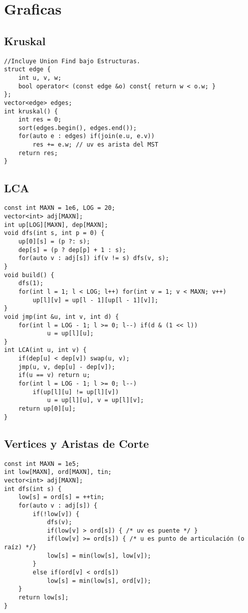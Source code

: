 \documentclass[twocolumn]{article}
\begin{document}
\section{Graficas}
\subsection{Kruskal}
\lstset{basicstyle=\footnotesize\ttfamily,breaklines=true,tabsize=2,language=C++,frame=leftline, numbers=left, numberstyle=\tiny, numbersep=5pt}
\begin{lstlisting}
//Incluye Union Find bajo Estructuras.
struct edge {
	int u, v, w;
	bool operator< (const edge &o) const{ return w < o.w; }
};
vector<edge> edges;
int kruskal() {
	int res = 0;
	sort(edges.begin(), edges.end());
	for(auto e : edges) if(join(e.u, e.v))
		res += e.w; // uv es arista del MST
	return res;
}
\end{lstlisting}
\subsection{LCA}
\lstset{basicstyle=\footnotesize\ttfamily,breaklines=true,tabsize=2,language=C++,frame=leftline, numbers=left, numberstyle=\tiny, numbersep=5pt}
\begin{lstlisting}
const int MAXN = 1e6, LOG = 20;
vector<int> adj[MAXN];
int up[LOG][MAXN], dep[MAXN];
void dfs(int s, int p = 0) {
	up[0][s] = (p ?: s);
	dep[s] = (p ? dep[p] + 1 : s);
	for(auto v : adj[s]) if(v != s) dfs(v, s);
}
void build() {
	dfs(1);
	for(int l = 1; l < LOG; l++) for(int v = 1; v < MAXN; v++)
		up[l][v] = up[l - 1][up[l - 1][v]];
}
void jmp(int &u, int v, int d) {
	for(int l = LOG - 1; l >= 0; l--) if(d & (1 << l))
			u = up[l][u];
}
int LCA(int u, int v) {
	if(dep[u] < dep[v]) swap(u, v);
	jmp(u, v, dep[u] - dep[v]);
	if(u == v) return u;
	for(int l = LOG - 1; l >= 0; l--)
		if(up[l][u] != up[l][v])
			u = up[l][u], v = up[l][v];
	return up[0][u];
}
\end{lstlisting}
\subsection{Vertices y Aristas de Corte}
\lstset{basicstyle=\footnotesize\ttfamily,breaklines=true,tabsize=2,language=C++,frame=leftline, numbers=left, numberstyle=\tiny, numbersep=5pt}
\begin{lstlisting}
const int MAXN = 1e5;
int low[MAXN], ord[MAXN], tin;
vector<int> adj[MAXN];
int dfs(int s) {
	low[s] = ord[s] = ++tin;
	for(auto v : adj[s]) {
		if(!low[v]) {
			dfs(v);
			if(low[v] > ord[s]) { /* uv es puente */ }
			if(low[v] >= ord[s]) { /* u es punto de articulación (o raíz) */}
			low[s] = min(low[s], low[v]);
		}
		else if(ord[v] < ord[s])
			low[s] = min(low[s], ord[v]);
	}
	return low[s];
}
\end{lstlisting}
\end{document}

